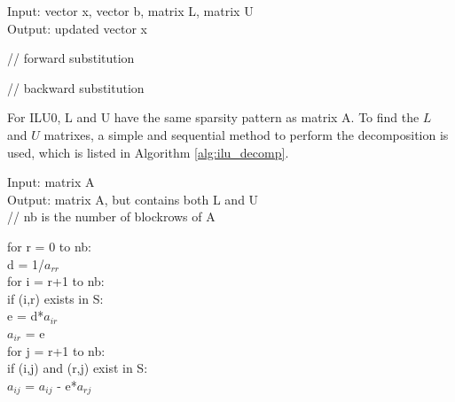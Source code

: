 
\begin{algorithm}
\caption{ILU0 application}
\label{alg:ilu_apply}
Input: vector x, vector b, matrix L, matrix U \\
Output: updated vector x 
\begin{algorithmic}
\STATE // forward substitution

\STATE // backward substitution
\end{algorithmic}
\end{algorithm}

For ILU0, L and U have the same sparsity pattern as matrix A. To find the $L$ and $U$ matrixes, a simple and sequential method to perform the decomposition is used, which is listed in Algorithm \ref{alg:ilu_decomp}.

\begin{algorithm}
\caption{ILU0 decomposition}
\label{alg:ilu_decomp}
Input: matrix A \\
Output: matrix A, but contains both L and U \\

// nb is the number of blockrows of A \\
\begin{algorithmic}
    

\STATE for r = 0 to nb: \\
    \STATE \hspace{0.5cm}d = 1/$a_{rr}$ \\
    \STATE \hspace{0.5cm}for i = r+1 to nb: \\
        \STATE \hspace{0.5cm} \hspace{0.5cm}if (i,r) exists in S: \\
        \STATE \hspace{0.5cm} \hspace{0.5cm}e = d*$a_{ir}$ \\
        \STATE \hspace{0.5cm} \hspace{0.5cm}$a_{ir}$ = e \\
        \STATE \hspace{0.5cm} \hspace{0.5cm}for j = r+1 to nb: \\
        \STATE \hspace{0.5cm} \hspace{0.5cm} \hspace{0.5cm}if (i,j) and (r,j) exist in S: \\
        \STATE \hspace{0.5cm} \hspace{0.5cm} \hspace{0.5cm} \hspace{0.5cm}$a_{ij}$ = $a_{ij}$ - e*$a_{rj}$ \\
\end{algorithmic}
\end{algorithm}


